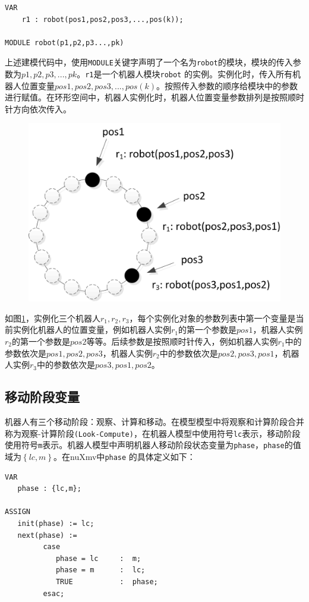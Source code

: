 \begin{lstlisting}
VAR
    r1 : robot(pos1,pos2,pos3,...,pos(k));

MODULE robot(p1,p2,p3...,pk)
\end{lstlisting}

上述建模代码中，使用\verb|MODULE|关键字声明了一个名为\verb|robot|的模块，模块的传入参数为$p1,p2,p3,...,pk$。\verb|r1|是一个机器人模块\verb|robot| 的实例。实例化时，传入所有机器人位置变量$pos1,pos2,pos3,...,pos\left(k\right)$。按照传入参数的顺序给模块中的参数进行赋值。在环形空间中，机器人实例化时，机器人位置变量参数排列是按照顺时针方向依次传入。

\begin{figure}[!hbt]
	\centering
	\includegraphics[width=4 in]{fig/params4.png}
	\caption{}
	\label{fig:params4}
\end{figure}

如图\ref{fig:params4}，实例化三个机器人$r_1,r_2,r_3$，每个实例化对象的参数列表中第一个变量是当前实例化机器人的位置变量，例如机器人实例$r_1$的第一个参数是$pos1$，机器人实例$r_2$的第一个参数是$pos2$等等。后续参数是按照顺时针传入，例如机器人实例$r_1$中的参数依次是$pos1,pos2,pos3$，机器人实例$r_2$中的参数依次是$pos2,pos3,pos1$，机器人实例$r_3$中的参数依次是$pos3,pos1,pos2$。

\subsection{移动阶段变量}
机器人有三个移动阶段：观察、计算和移动。在模型模型中将观察和计算阶段合并称为观察-计算阶段\verb|(Look-Compute)|，在机器人模型中使用符号\verb|lc|表示，移动阶段使用符号\verb|m|表示。机器人模型中声明机器人移动阶段状态变量为\verb|phase|，\verb|phase|的值域为$\left\{lc,m\right\}$。在nuXmv中\verb|phase| 的具体定义如下：

\begin{lstlisting}
VAR
   phase : {lc,m};

ASSIGN
   init(phase) := lc;
   next(phase) :=
         case
            phase = lc     :  m;
            phase = m      :  lc;
            TRUE           :  phase;
         esac;
\end{lstlisting}

